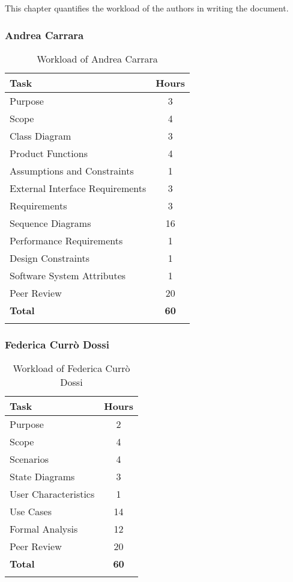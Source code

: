 This chapter quantifies the workload of the authors in writing the document.

\subsubsection{Andrea Carrara}
\renewcommand{\arraystretch}{1.5}
\begin{longtable}{|p{8.5cm}|c|}
    \hline \rowcolor{polimiblue!40}
    \textbf{Task} & \textbf{Hours} \\ \hline
    Purpose & 3 \\ \hline
    Scope & 4 \\ \hline
    Class Diagram & 3 \\ \hline
    Product Functions & 4 \\ \hline
    Assumptions and Constraints & 1 \\ \hline
    External Interface Requirements & 3 \\ \hline
    Requirements & 3 \\ \hline
    Sequence Diagrams & 16 \\ \hline
    Performance Requirements & 1 \\ \hline
    Design Constraints & 1 \\ \hline
    Software System Attributes & 1 \\ \hline
    Peer Review & 20 \\ \hline
    \hline \rowcolor{polimiblue!40}
    \textbf{Total} & \textbf{60} \\ \hline
\caption{Workload of Andrea Carrara}
\end{longtable}

\subsubsection{Federica Currò Dossi}
\renewcommand{\arraystretch}{1.5}
\begin{longtable}{|p{8.5cm}|c|}
    \hline \rowcolor{polimiblue!40}
    \textbf{Task} & \textbf{Hours} \\ \hline
    Purpose & 2 \\ \hline
    Scope & 4 \\ \hline
    Scenarios & 4 \\ \hline
    State Diagrams & 3 \\ \hline
    User Characteristics & 1 \\ \hline
    Use Cases & 14 \\ \hline
    Formal Analysis & 12 \\ \hline
    Peer Review & 20 \\ \hline
    \hline \rowcolor{polimiblue!40}
    \textbf{Total} & \textbf{60} \\ \hline
\caption{Workload of Federica Currò Dossi}
\end{longtable}
